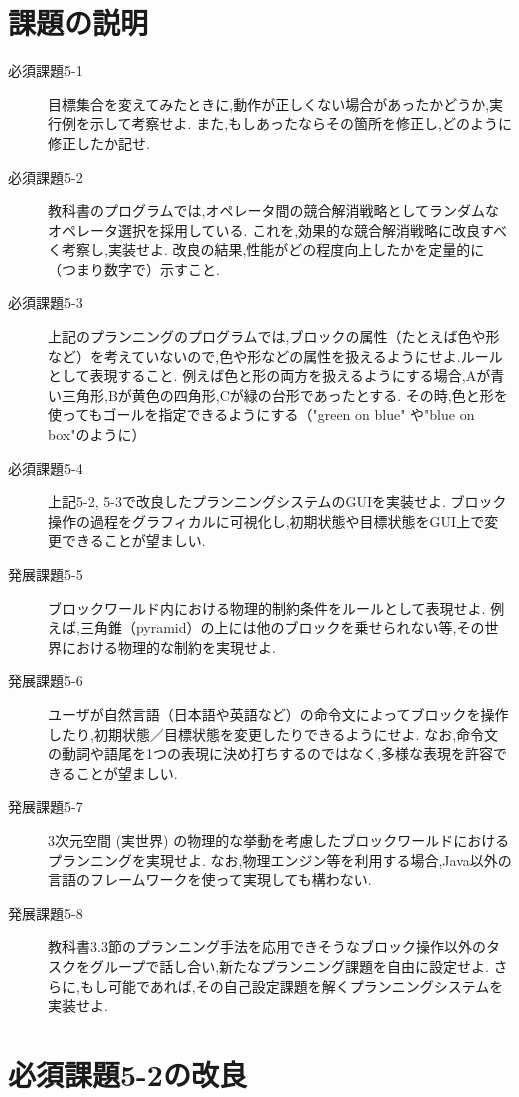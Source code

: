 \documentclass[uplatex,12pt]{jsarticle}
\begin{document}
\section{課題の説明}
\begin{description}
\item[必須課題5-1] 目標集合を変えてみたときに,動作が正しくない場合があったかどうか,実行例を示して考察せよ.
また,もしあったならその箇所を修正し,どのように修正したか記せ.
\item[必須課題5-2] 教科書のプログラムでは,オペレータ間の競合解消戦略としてランダムなオペレータ選択を採用している.
これを,効果的な競合解消戦略に改良すべく考察し,実装せよ.
改良の結果,性能がどの程度向上したかを定量的に（つまり数字で）示すこと.
\item[必須課題5-3] 上記のプランニングのプログラムでは,ブロックの属性（たとえば色や形など）を考えていないので,色や形などの属性を扱えるようにせよ.ルールとして表現すること.
例えば色と形の両方を扱えるようにする場合,Aが青い三角形,Bが黄色の四角形,Cが緑の台形であったとする.
その時,色と形を使ってもゴールを指定できるようにする（"green on blue" や"blue on box"のように）
\item[必須課題5-4] 上記5-2, 5-3で改良したプランニングシステムのGUIを実装せよ.
ブロック操作の過程をグラフィカルに可視化し,初期状態や目標状態をGUI上で変更できることが望ましい.
\item[発展課題5-5] ブロックワールド内における物理的制約条件をルールとして表現せよ.
例えば,三角錐（pyramid）の上には他のブロックを乗せられない等,その世界における物理的な制約を実現せよ.
\item[発展課題5-6] ユーザが自然言語（日本語や英語など）の命令文によってブロックを操作したり,初期状態／目標状態を変更したりできるようにせよ.
なお,命令文の動詞や語尾を1つの表現に決め打ちするのではなく,多様な表現を許容できることが望ましい.
\item[発展課題5-7] 3次元空間 (実世界) の物理的な挙動を考慮したブロックワールドにおけるプランニングを実現せよ.
なお,物理エンジン等を利用する場合,Java以外の言語のフレームワークを使って実現しても構わない.
\item[発展課題5-8] 教科書3.3節のプランニング手法を応用できそうなブロック操作以外のタスクをグループで話し合い,新たなプランニング課題を自由に設定せよ.
さらに,もし可能であれば,その自己設定課題を解くプランニングシステムを実装せよ.
\end{description}


\section{必須課題5-2の改良}
\end{document}
